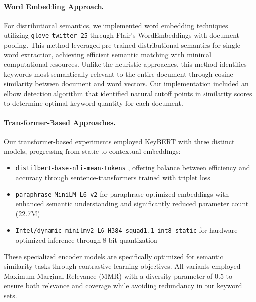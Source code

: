 \documentclass[sigconf]{acmart}
\begin{document}
\paragraph{Word Embedding Approach.}
For distributional semantics, we implemented word embedding techniques utilizing \texttt{glove-twitter-25} \cite{pennington2014glove} through Flair's \cite{akbik2019flair} WordEmbeddings with document pooling. This method leveraged pre-trained distributional semantics for single-word extraction, achieving efficient semantic matching with minimal computational resources. Unlike the heuristic approaches, this method identifies keywords most semantically relevant to the entire document through cosine similarity between document and word vectors. Our implementation included an elbow detection algorithm that identified natural cutoff points in similarity scores to determine optimal keyword quantity for each document.

\paragraph{Transformer-Based Approaches.}
Our transformer-based experiments employed KeyBERT \cite{grootendorst2020keybert} with three distinct models, progressing from static to contextual embeddings:
\begin{itemize}
    \item \texttt{distilbert-base-nli-mean-tokens} \cite{DBLP:journals/corr/abs-1910-01108}, offering balance between efficiency and accuracy through sentence-transformers trained with triplet loss
    \item \texttt{paraphrase-MiniLM-L6-v2} \cite{DBLP:conf/acl/WangBHDW21} for paraphrase-optimized embeddings with enhanced semantic understanding and significantly reduced parameter count (22.7M)
    \item \texttt{Intel/dynamic-minilmv2-L6-H384-squad1.1-int8-static} \cite{DBLP:journals/corr/abs-2210-17114} for hardware-optimized inference through 8-bit quantization
\end{itemize}

These specialized encoder models are specifically optimized for semantic similarity tasks through contrastive learning objectives. All variants employed Maximum Marginal Relevance (MMR) \cite{DBLP:conf/sigir/CarbonellG98} with a diversity parameter of 0.5 to ensure both relevance and coverage while avoiding redundancy in our keyword sets.
\end{document}
